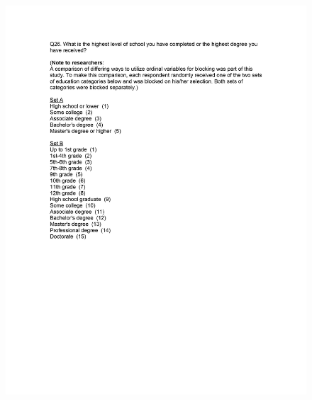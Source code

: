 \documentclass[12pt,econ]{sources/authesis}
\makeatletter
\def\maxwidth{\ifdim\Gin@nat@width>\linewidth\linewidth
\else\Gin@nat@width\fi}
\let\Oldincludegraphics\includegraphics
\renewcommand{\includegraphics}[1]{\Oldincludegraphics[width=\maxwidth]{#1}}
\makeatother
\begin{document}
\begin{figure}[hbt]
  \centering
\includegraphics{data/framing/appendix/questionnaire/questionnaire13.jpg}
\end{figure}
\end{document}
